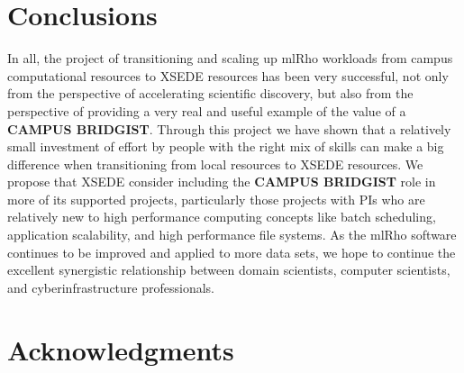 \documentclass{sig-alternate}
\begin{document}
\section{Conclusions}\label{sec:conclusion}

In all, the project of transitioning and scaling up mlRho workloads from campus computational resources
to XSEDE resources has been very successful, not only from the perspective of accelerating scientific
discovery, but also from the perspective of providing a very real and useful example of the value of a {\bf
  CAMPUS BRIDGIST}. Through this project we have shown that a relatively small investment of effort by people
with the right mix of skills can make a big difference when transitioning from local
resources to XSEDE resources. We propose that XSEDE consider including the {\bf CAMPUS BRIDGIST} role in more
of its supported projects, particularly those projects with PIs who are relatively new to high performance
computing concepts like batch scheduling, application scalability, and high performance file systems. As the
mlRho software continues to be improved and applied to more data sets, we hope to continue the excellent
synergistic relationship between domain scientists, computer scientists, and cyberinfrastructure
professionals.


\section{Acknowledgments}
%

%
%
\end{document}
